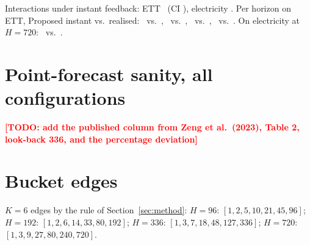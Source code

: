 \documentclass[11pt]{article}
\newcommand{\todo}[1]{\textcolor{red}{\textbf{[TODO: #1]}}}
\begin{document}
Interactions under instant feedback: ETT \ettInteraction\ (CI \ettInteractionCI), electricity \eclInteraction. Per horizon on ETT, Proposed instant vs.\ realised: \ettPropWorstNinetySix\ vs.\ \ettPropWorstNinetySixD, \ettPropWorstOneNinetyTwo\ vs.\ \ettPropWorstOneNinetyTwoD, \ettPropWorstThreeThirtySix\ vs.\ \ettPropWorstThreeThirtySixD, \ettPropWorstSevenTwenty\ vs.\ \ettPropWorstSevenTwentyD. On electricity at $H = 720$: \eclPropWorstSevenTwenty\ vs.\ \eclPropWorstSevenTwentyD.

\section{Point-forecast sanity, all configurations}\label{app:point}

\begin{center}\small

\end{center}
\todo{add the published column from Zeng et al.\ (2023), Table 2, look-back 336, and the percentage deviation}

\section{Bucket edges}\label{app:buckets}

$K = 6$ edges by the rule of Section~\ref{sec:method}: $H = 96$: $[1,2,5,10,21,45,96]$; $H = 192$: $[1,2,6,14,33,80,192]$; $H = 336$: $[1,3,7,18,48,127,336]$; $H = 720$: $[1,3,9,27,80,240,720]$.
\end{document}
